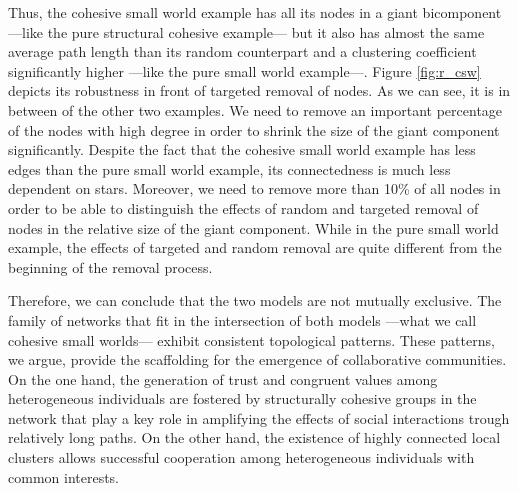 Thus, the cohesive small world example has all its nodes in a giant bicomponent ---like the pure structural cohesive example--- but it also has almost the same average path length than its random counterpart and a clustering coefficient significantly higher ---like the pure small world example---. Figure \ref{fig:r_csw} depicts its robustness in front of targeted removal of nodes. As we can see, it is in between of the other two examples. We need to remove an important percentage of the nodes with high degree in order to shrink the size of the giant component significantly. Despite the fact that the cohesive small world example has less edges than the pure small world example, its connectedness is much less dependent on stars. Moreover, we need to remove more than 10\% of all nodes in order to be able to distinguish the effects of random and targeted removal of nodes in the relative size of the giant component. While in the pure small world example, the effects of targeted and random removal are quite different from the beginning of the removal process.

Therefore, we can conclude that the two models are not mutually exclusive. The family of networks that fit in the intersection of both models ---what we call cohesive small worlds--- exhibit consistent topological patterns. These patterns, we argue, provide the scaffolding for the emergence of collaborative communities. On the one hand, the generation of trust and congruent values among heterogeneous individuals are fostered by structurally cohesive groups in the network that play a key role in amplifying the effects of social interactions trough relatively long paths. On the other hand, the existence of highly connected local clusters allows successful cooperation among heterogeneous individuals with common interests.

